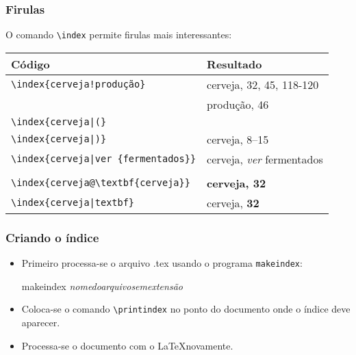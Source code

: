 \documentclass{beamer}
\newcommand{\pacote}[1]{\texttt{\textcolor[rgb]{0.3,0.6,0}{#1}}}
\begin{document}
\begin{frame}[fragile]
\frametitle{Firulas}

	O comando \verb!\index! permite firulas mais interessantes:

\begin{small}
\begin{tabular}{l | l}
\hline
\textbf{Código} 		& \textbf{Resultado} \\
\hline
\verb$\index{cerveja!produção}$  & cerveja, 32, 45, 118-120 \\
							& \hspace{15pt} produção, 46 \\
\hline
\verb$\index{cerveja|(}$		&	\\
\verb$\index{cerveja|)}$		& cerveja, 8--15  \\
\hline
\verb$\index{cerveja|ver {fermentados}}$ & cerveja, \emph{ver} fermentados \\ \\
\hline
\verb$\index{cerveja@\textbf{cerveja}}$ & \textbf{cerveja, 32} \\
\hline 
\verb$\index{cerveja|textbf}$ & cerveja, \textbf{32} \\
\hline
\end{tabular}
\end{small}

\end{frame}

\begin{frame}[fragile]
\frametitle{Criando o índice}

\begin{itemize}
 \item Primeiro processa-se o arquivo .tex usando o programa \pacote{makeindex}: \\
	\begin{semiverbatim}
	 makeindex \emph{nomedoarquivosemextensão}
	\end{semiverbatim}
 \item Coloca-se o comando \verb!\printindex! no ponto do documento onde o índice deve aparecer.
\item Processa-se o documento com o \LaTeX novamente. 
	
\end{itemize}


\end{frame}
\end{document}
